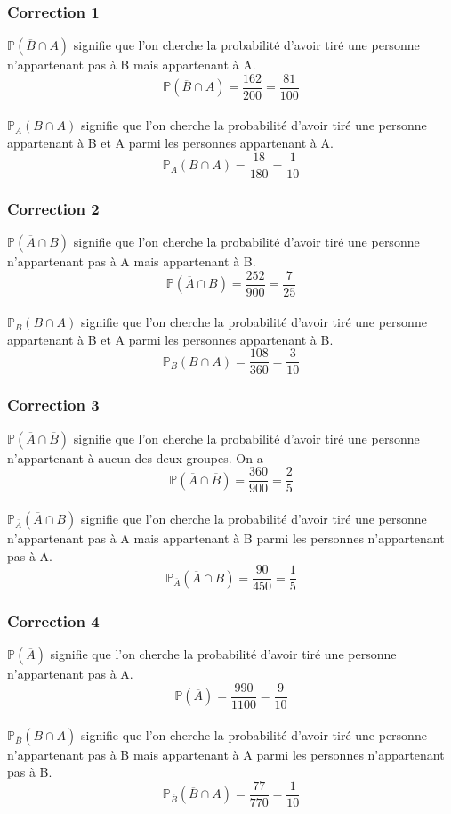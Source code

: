 \documentclass[15pt, mathserif]{beamer}
\begin{document}
\begin{frame}
\vspace{-10mm}
	\frametitle{Correction 1}

 $\mathbb{P}(\overline{B} \cap A)$ signifie que l'on cherche la probabilité d'avoir tiré une personne n'appartenant pas à B mais appartenant à A. $$\mathbb{P}(\overline{B} \cap A)=\dfrac{162}{200 }= \dfrac{81}{100}$$
 \\ $\mathbb{P}_{A} (B \cap A)$ signifie que l'on cherche la probabilité d'avoir tiré une personne appartenant à B et A parmi les personnes appartenant à A. $$\mathbb{P}_{A} (B \cap A)=\dfrac{18}{180 }= \dfrac{1}{10}$$ 
 
\end{frame}


\begin{frame}
\vspace{-10mm}
	\frametitle{Correction 2}

 $\mathbb{P}(\overline{A} \cap B)$ signifie que l'on cherche la probabilité d'avoir tiré une personne  n'appartenant pas à A mais appartenant à B. $$\mathbb{P}(\overline{A} \cap B)=\dfrac{252}{900 }= \dfrac{7}{25}$$
 \\ $\mathbb{P}_{B} (B \cap A)$ signifie que l'on cherche la probabilité d'avoir tiré une personne appartenant à B et A parmi les personnes appartenant à B. $$\mathbb{P}_{B} (B \cap A) =\dfrac{108}{360 }= \dfrac{3}{10}$$
\end{frame}


\begin{frame}
\vspace{-10mm}
	\frametitle{Correction 3}

 $\mathbb{P}(\overline{A} \cap \overline{B})$ signifie que l'on cherche la probabilité d'avoir tiré une personne n'appartenant à aucun des deux groupes. On a $$\mathbb{P}(\overline{A} \cap \overline{B})=\dfrac{360}{900 }= \dfrac{2}{5}$$
 \\ $\mathbb{P}_{\overline{A}} (\overline{A} \cap B)$ signifie que l'on cherche la probabilité d'avoir tiré une personne n'appartenant pas à A mais appartenant à B parmi les personnes n'appartenant pas à A. $$\mathbb{P}_{\overline{A}} (\overline{A} \cap B)=\dfrac{90}{450 }= \dfrac{1}{5}$$
\end{frame}


\begin{frame}
\vspace{-10mm}
	\frametitle{Correction 4}

 $\mathbb{P}(\overline{A})$ signifie que l'on cherche la probabilité d'avoir tiré une personne n'appartenant pas à A.  $$\mathbb{P}(\overline{A})=\dfrac{990}{1100 }= \dfrac{9}{10}$$
 \\ $\mathbb{P}_{\overline{B}} (\overline{B} \cap A)$ signifie que l'on cherche la probabilité d'avoir tiré une personne n'appartenant pas à B mais appartenant à A parmi les personnes n'appartenant pas à B. $$\mathbb{P}_{\overline{B}} (\overline{B} \cap A)=\dfrac{77}{770 }= \dfrac{1}{10}$$
\end{frame}
\end{document}
